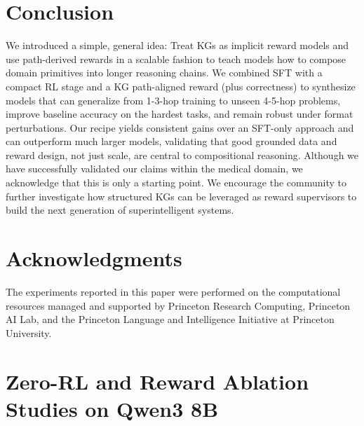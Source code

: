 \documentclass{article}
\theoremstyle{plain}
\theoremstyle{definition}
\theoremstyle{remark}
\begin{document}
\section{Conclusion}
We introduced a simple, general idea: Treat KGs as implicit reward models and use path-derived rewards in a scalable fashion to teach models how to compose domain primitives into longer reasoning chains. We combined SFT with a compact RL stage and a KG path-aligned reward (plus correctness) to synthesize models that can generalize from 1-3-hop training to unseen 4-5-hop problems, improve baseline accuracy on the hardest tasks, and remain robust under format perturbations. Our recipe yields consistent gains over an SFT-only approach and can outperform much larger models, validating that good grounded data and reward design, not just scale, are central to compositional reasoning. Although we have successfully validated our claims within the medical domain, we acknowledge that this is only a starting point. We encourage the community to further investigate how structured KGs can be leveraged as reward supervisors to build the next generation of superintelligent systems.

\section*{Acknowledgments}

The experiments reported in this paper were performed on the computational resources managed and supported by Princeton Research Computing, Princeton AI Lab, and the Princeton Language and Intelligence Initiative at Princeton University.


\newpage



\newpage
\appendix
\onecolumn

\section{Zero-RL and Reward Ablation Studies on Qwen3 8B}
\label{Appendix A}
\end{document}
